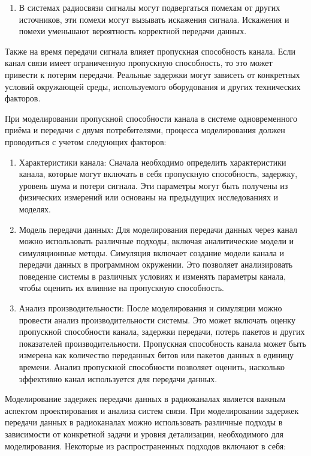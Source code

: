 \begin{onehalfspace}
\begin{enumerate}
\item В системах радиосвязи сигналы могут подвергаться помехам от других источников, эти помехи могут вызывать искажения сигнала. Искажения и помехи уменьшают вероятность корректной передачи данных.

\end{enumerate} 

Также на время передачи сигнала влияет пропускная способность канала. Если канал связи имеет ограниченную пропускную способность, то это может привести к потерям передачи. Реальные задержки могут зависеть от конкретных условий окружающей среды, используемого оборудования и других технических факторов.

При моделировании пропускной способности канала в системе одновременного приёма и передачи с двумя потребителями, процесса моделирования должен проводиться с учетом следующих факторов:

\begin{enumerate} 
\item Характеристики канала: Сначала необходимо определить характеристики канала, которые могут включать в себя пропускную способность, задержку, уровень шума и потери сигнала. Эти параметры могут быть получены из физических измерений или основаны на предыдущих исследованиях и моделях.

\item Модель передачи данных: Для моделирования передачи данных через канал можно использовать различные подходы, включая аналитические модели и симуляционные методы. Симуляция включает создание модели канала и передачи данных в программном окружении. Это позволяет анализировать поведение системы в различных условиях и изменять параметры канала, чтобы оценить их влияние на пропускную способность.

\item Анализ производительности: После моделирования и симуляции можно провести анализ производительности системы. Это может включать оценку пропускной способности канала, задержки передачи, потерь пакетов и других показателей производительности. Пропускная способность канала может быть измерена как количество переданных битов или пакетов данных в единицу времени. Анализ пропускной способности позволяет оценить, насколько эффективно канал используется для передачи данных. 
\end{enumerate} 

Моделирование задержек передачи данных в радиоканалах является важным аспектом проектирования и анализа систем связи. При моделировании задержек передачи данных в радиоканалах можно использовать различные подходы в зависимости от конкретной задачи и уровня детализации, необходимого для моделирования. Некоторые из распространенных подходов включают в себя:


\end{onehalfspace}
